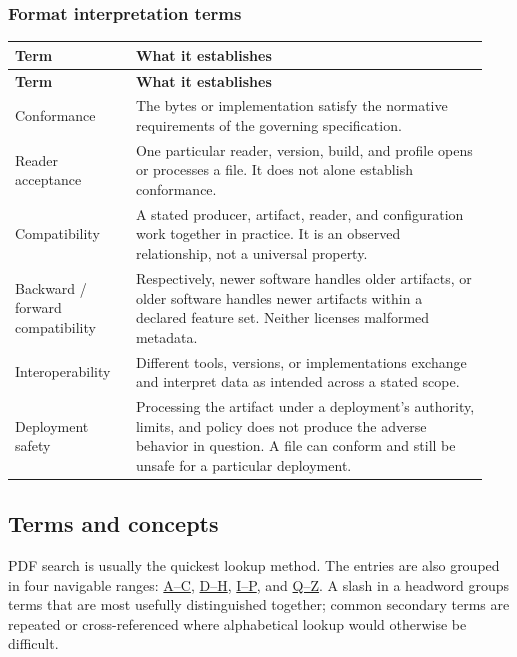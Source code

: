 \documentclass[../main.tex]{subfiles}
\begin{document}
\subsubsection{Format interpretation terms}

\begingroup
\small
\setlength{\tabcolsep}{3pt}
\renewcommand{\arraystretch}{1.12}
\begin{longtable}{@{}>{\raggedright\arraybackslash}p{0.24\linewidth}>{\raggedright\arraybackslash}p{0.70\linewidth}@{}}
\hline
\textbf{Term} & \textbf{What it establishes} \\
\hline
\endfirsthead
\hline
\textbf{Term} & \textbf{What it establishes} \\
\hline
\endhead
\hline
\endfoot

Conformance & The bytes or implementation satisfy the normative requirements
of the governing specification. \\

Reader acceptance & One particular reader, version, build, and profile opens
or processes a file. It does not alone establish conformance. \\

Compatibility & A stated producer, artifact, reader, and configuration work
together in practice. It is an observed relationship, not a universal property. \\

Backward / forward compatibility & Respectively, newer software handles older
artifacts, or older software handles newer artifacts within a declared feature
set. Neither licenses malformed metadata. \\

Interoperability & Different tools, versions, or implementations exchange and
interpret data as intended across a stated scope. \\

Deployment safety & Processing the artifact under a deployment's authority,
limits, and policy does not produce the adverse behavior in question. A file
can conform and still be unsafe for a particular deployment. \\

\end{longtable}
\endgroup

\subsection{Terms and concepts}

PDF search is usually the quickest lookup method. The entries are also grouped
in four navigable ranges: \hyperref[glossary:ac]{A--C},
\hyperref[glossary:dh]{D--H}, \hyperref[glossary:ip]{I--P}, and
\hyperref[glossary:qz]{Q--Z}. A slash in a headword groups terms that are most
usefully distinguished together; common secondary terms are repeated or
cross-referenced where alphabetical lookup would otherwise be difficult.
\end{document}
